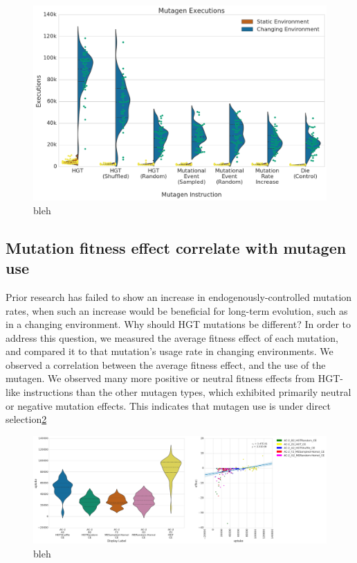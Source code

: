 \documentclass[PhD]{msu-thesis}
\begin{document}
\begin{figure}[h!]
\begin{center}
\includegraphics[width=0.7\columnwidth]{figures/HGT/mutagen_execution.png}
\caption{bleh
}\label{fig:mutagen_execution}
\end{center}
\end{figure}



\subsection{Mutation fitness effect correlate with mutagen use}

Prior research has failed to show an increase in endogenously-controlled mutation rates, when such an increase would be beneficial for long-term evolution, such as in a changing environment. Why should HGT mutations be different? In order to address this question, we measured the average fitness effect of each mutation, and compared it to that mutation's usage rate in changing environments. We observed a correlation between the average fitness effect, and the use of the mutagen. We observed many more positive or neutral fitness effects from HGT-like instructions than the other mutagen types, which exhibited primarily neutral or negative mutation effects. This indicates that mutagen use is under direct selection\ref{fig:mutagen_use_vs_fitness_effect}

\begin{figure}[h!]
\begin{center}
\includegraphics[width=0.7\columnwidth]{figures/HGT/mutagen_use_vs_fitness_effect.png}
\caption{bleh
}\label{fig:mutagen_use_vs_fitness_effect}
\end{center}
\end{figure}
\end{document}

